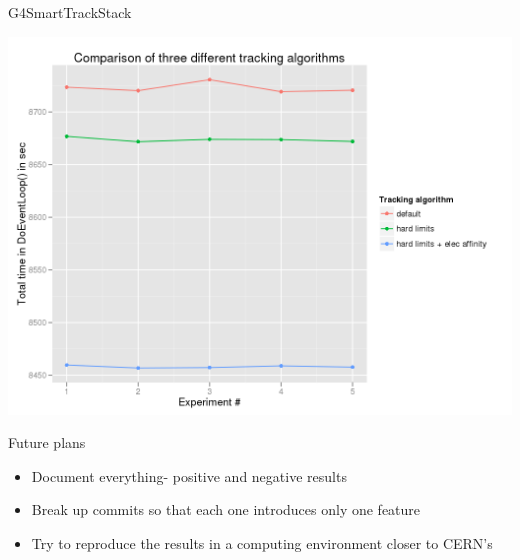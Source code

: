 \documentclass{beamer}
\begin{document}
\begin{frame}{G4SmartTrackStack}

\begin{center}
  \includegraphics[width=1.0\textwidth]{trackingcmp.png}
\end{center}
\end{frame}

\begin{frame}{Future plans}

\begin{itemize}
\item Document everything- positive and negative results
\item Break up commits so that each one introduces only one feature
\item Try to reproduce the results in a computing environment closer to CERN's
\end{itemize}
\end{frame}
\end{document}
